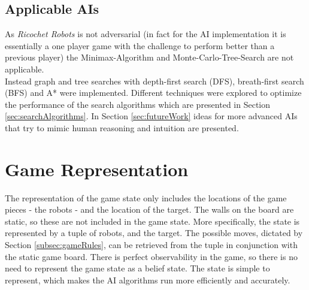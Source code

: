 \documentclass[a4paper,10pt]{article}
\begin{document}
  \subsection{Applicable AIs}
  As \textit{Ricochet Robots} is not adversarial (in fact for the AI implementation it is essentially a one player game with the challenge to perform better than a previous player) the Minimax-Algorithm and Monte-Carlo-Tree-Search are not applicable. \\
  Instead graph and tree searches with depth-first search (DFS), breath-first search (BFS) and A* were implemented. Different techniques were explored to optimize the performance of the search algorithms which are presented in Section \ref{sec:searchAlgorithms}. In Section \ref{sec:futureWork} ideas for more advanced AIs that try to mimic human reasoning and intuition are presented.

\section{Game Representation}
\label{sec:gameRep}
The representation of the game state only includes the locations of the game pieces - the robots - and the location of the target. The walls on the board are static, so these are not included in the game state. More specifically, the state is represented by a tuple of robots, and the target. The possible moves, dictated by Section \ref{subsec:gameRules}, can be retrieved from the tuple in conjunction with the static game board. There is perfect observability in the game, so there is no need to represent the game state as a belief state. The state is simple to represent, which makes the AI algorithms run more efficiently and accurately.
\end{document}
